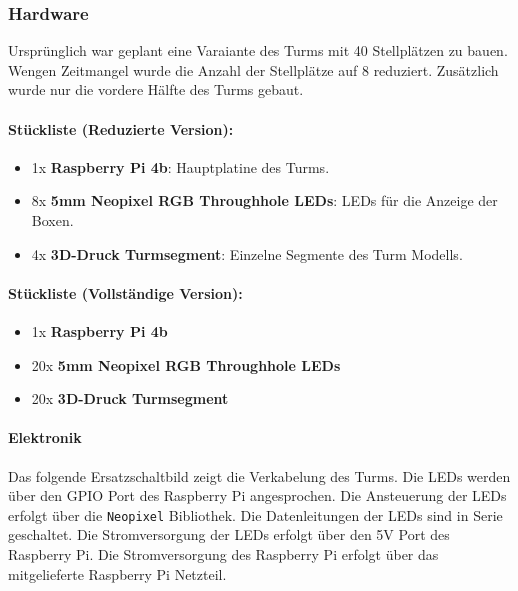 \subsubsection{Hardware}

Ursprünglich war geplant eine Varaiante des Turms mit 40 Stellplätzen zu bauen. Wengen Zeitmangel wurde die Anzahl der Stellplätze auf 8 reduziert. Zusätzlich wurde nur die vordere Hälfte des Turms gebaut.

\paragraph{Stückliste (Reduzierte Version):}
\begin{itemize}
  \item 1x \textbf{Raspberry Pi 4b}: Hauptplatine des Turms.
  \item 8x \textbf{5mm Neopixel RGB Throughhole LEDs}: LEDs für die Anzeige der Boxen.
  \item 4x \textbf{3D-Druck Turmsegment}: Einzelne Segmente des Turm Modells.
\end{itemize}

\paragraph{Stückliste (Vollständige Version):}
\begin{itemize}
  \item 1x \textbf{Raspberry Pi 4b}
  \item 20x \textbf{5mm Neopixel RGB Throughhole LEDs}
  \item 20x \textbf{3D-Druck Turmsegment}
\end{itemize}

\paragraph{Elektronik}

Das folgende Ersatzschaltbild zeigt die Verkabelung des Turms. Die LEDs werden über den GPIO Port des Raspberry Pi angesprochen. Die Ansteuerung der LEDs erfolgt über die \texttt{Neopixel} Bibliothek. Die Datenleitungen der LEDs sind in Serie geschaltet. Die Stromversorgung der LEDs erfolgt über den 5V Port des Raspberry Pi. Die Stromversorgung des Raspberry Pi erfolgt über das mitgelieferte Raspberry Pi Netzteil.

